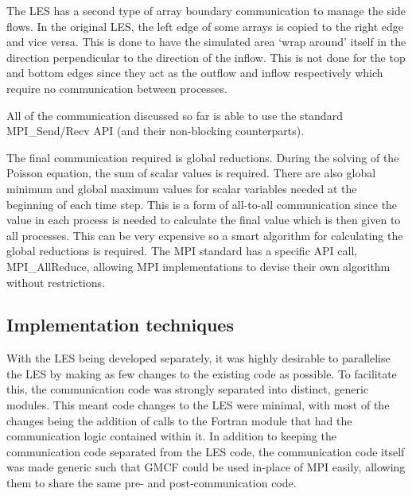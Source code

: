The LES has a second type of array boundary communication to manage the side
flows. In the original LES, the left edge of some arrays is copied to the right
edge and vice versa. This is done to have the simulated area `wrap around'
itself in the direction perpendicular to the direction of the inflow. This is
not done for the top and bottom edges since they act as the outflow and inflow
respectively which require no communication between processes.

All of the communication discussed so far is able to use the standard
MPI\_Send/Recv API (and their non-blocking counterparts).

The final communication required is global reductions. During the solving of the
Poisson equation, the sum of scalar values is required. There are also global
minimum and global maximum values for scalar variables needed at the beginning
of each time step. This is a form of all-to-all communication since the value in
each process is needed to calculate the final value which is then given to all
processes. This can be very expensive so a smart algorithm for calculating the
global reductions is required. The MPI standard has a specific API call,
MPI\_AllReduce, allowing MPI implementations to devise their own algorithm
without restrictions.

\subsection{Implementation techniques}

With the LES being developed separately, it was highly desirable to parallelise
the LES by making as few changes to the existing code as possible. To facilitate
this, the communication code was strongly separated into distinct, generic
modules. This meant code changes to the LES were minimal, with most of the
changes being the addition of calls to the Fortran module that had the
communication logic contained within it. In addition to keeping the
communication code separated from the LES code, the communication code itself
was made generic such that GMCF could be used in-place of MPI easily, allowing
them to share the same pre- and post-communication code.
